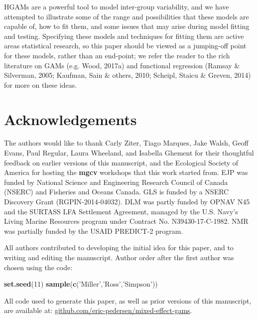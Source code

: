 \documentclass[12pt]{article}
\newenvironment{Shaded}{\begin{snugshade}}{\end{snugshade}}
\newcommand{\KeywordTok}[1]{\textcolor[rgb]{0.13,0.29,0.53}{\textbf{#1}}}
\newcommand{\DecValTok}[1]{\textcolor[rgb]{0.00,0.00,0.81}{#1}}
\newcommand{\StringTok}[1]{\textcolor[rgb]{0.31,0.60,0.02}{#1}}
\newcommand{\NormalTok}[1]{#1}
\begin{document}
HGAMs are a powerful tool to model inter-group variability, and we have
attempted to illustrate some of the range and possibilities that these
models are capable of, how to fit them, and some issues that may arise
during model fitting and testing. Specifying these models and techniques
for fitting them are active areas statistical research, so this paper
should be viewed as a jumping-off point for these models, rather than an
end-point; we refer the reader to the rich literature on GAMs (e.g.
Wood, 2017a) and functional regression (Ramsay \& Silverman, 2005;
Kaufman, Sain \& others, 2010; Scheipl, Staicu \& Greven, 2014) for more
on these ideas.

\section{Acknowledgements}\label{acknowledgements}

The authors would like to thank Carly Ziter, Tiago Marques, Jake Walsh,
Geoff Evans, Paul Regular, Laura Wheeland, and Isabella Ghement for
their thoughtful feedback on earlier versions of this manuscript, and
the Ecological Society of America for hosting the \textbf{mgcv}
workshops that this work started from. EJP was funded by National
Science and Engineering Research Council of Canada (NSERC) and Fisheries
and Oceans Canada. GLS is funded by a NSERC Discovery Grant
(RGPIN-2014-04032). DLM was partly funded by OPNAV N45 and the SURTASS
LFA Settlement Agreement, managed by the U.S. Navy's Living Marine
Resources program under Contract No. N39430-17-C-1982. NMR was partially
funded by the USAID PREDICT-2 program.

All authors contributed to developing the initial idea for this paper,
and to writing and editing the manuscript. Author order after the first
author was chosen using the code:

\begin{Shaded}
\begin{Highlighting}[]
\KeywordTok{set.seed}\NormalTok{(}\DecValTok{11}\NormalTok{)}
\KeywordTok{sample}\NormalTok{(}\KeywordTok{c}\NormalTok{(}\StringTok{'Miller'}\NormalTok{,}\StringTok{'Ross'}\NormalTok{,}\StringTok{'Simpson'}\NormalTok{))}
\end{Highlighting}
\end{Shaded}

All code used to generate this paper, as well as prior versions of this
manuscript, are available at:
\href{https://github.com/eric-pedersen/mixed-effect-gams}{github.com/eric-pedersen/mixed-effect-gams}.
\end{document}

